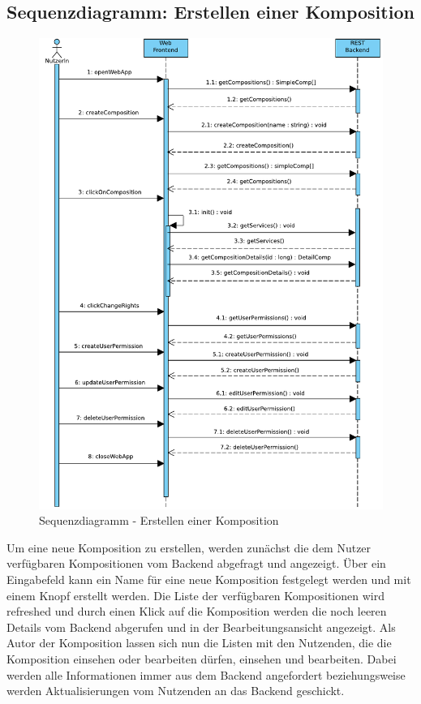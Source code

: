 \subsection*{Sequenzdiagramm: Erstellen einer Komposition}

\begin{figure}[h]
	\centering
	\includegraphics[width=.75\textwidth]{img/Diagramme/Sequenz/Frontend_createComp}
			
	\caption{Sequenzdiagramm - Erstellen einer Komposition}
	\label{fig:sequenz-createComp}
\end{figure}
\noindent
Um eine neue Komposition zu erstellen, werden zunächst die dem Nutzer verfügbaren Kompositionen vom Backend abgefragt und angezeigt. Über ein Eingabefeld kann ein Name für eine neue Komposition festgelegt werden und mit einem Knopf erstellt werden. Die Liste der verfügbaren Kompositionen wird refreshed und durch einen Klick auf die Komposition werden die noch leeren Details vom Backend abgerufen und in der Bearbeitungsansicht angezeigt. Als Autor der Komposition lassen sich nun die Listen mit den Nutzenden, die die Komposition einsehen oder bearbeiten dürfen, einsehen und bearbeiten. Dabei werden alle Informationen immer aus dem Backend angefordert beziehungsweise werden Aktualisierungen vom Nutzenden an das Backend geschickt.

